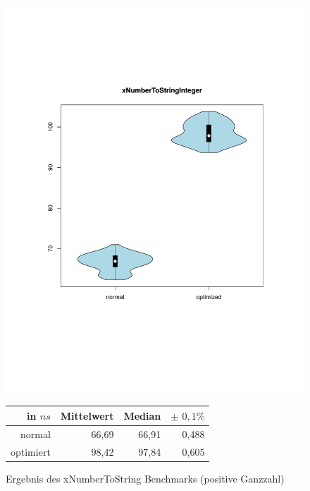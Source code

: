 \begin{figure}[H]
{		\includegraphics[trim=20mm 60mm 0mm 50mm,scale=0.50]{pictures/vioplot_xNumberToStringInteger.pdf}
	}

	\begin{table}[H]
	\centering
		\begin{tabular}{|r|r|r|r|}
			\hline
		   	in $ns$   & Mittelwert & Median & \bf{$\pm$ $0,1\%$} \\
		 	\hline
		 	\hline
		  	normal 	  & 66,69 & 66,91 & 0,488 \\
		 	optimiert & 98,42 & 97,84 & 0,605 \\ 
		  	\hline
		  	
		\end{tabular}
	\end{table}

	\caption{Ergebnis des xNumberToString Benchmarks (positive Ganzzahl)}\label{bp:xNumInt}
\end{figure}


